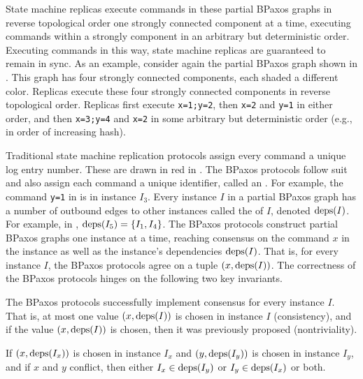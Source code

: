 State machine replicas execute commands in these partial BPaxos graphs in
reverse topological order one strongly connected component at a time, executing
commands within a strongly component in an arbitrary but deterministic order.
Executing commands in this way, state machine replicas are guaranteed to remain
in sync. As an example, consider again the partial BPaxos graph shown in
. This graph has four strongly connected components, each
shaded a different color. Replicas execute these four strongly connected
components in reverse topological order. Replicas first execute
\texttt{x=1;y=2}, then \texttt{x=2} and \texttt{y=1} in either order, and then
\texttt{x=3;y=4} and \texttt{x=2} in some arbitrary but deterministic order
(e.g., in order of increasing hash).

Traditional state machine replication protocols assign every command a unique
log entry number. These are drawn in red in . The BPaxos
protocols follow suit and also assign each command a unique identifier, called
an . For example, the command \texttt{y=1} in
 is in instance $I_3$. Every instance $I$ in a partial BPaxos
graph has a number of outbound edges to other instances called the
 of $I$, denoted $\text{deps}(I)$. For example, in
, $\text{deps}(I_5) = \{I_1, I_4\}$.
%
The BPaxos protocols construct partial BPaxos graphs one instance at a time,
reaching consensus on the command $x$ in the instance as well as the instance's
dependencies $\text{deps}(I)$. That is, for every instance $I$, the BPaxos protocols
agree on a tuple $(x, \text{deps}(I))$.
%
The correctness of the BPaxos protocols hinges on the following two key
invariants.

\begin{invariant}
  The BPaxos protocols successfully implement consensus for every instance $I$.
  That is, at most one value $(x, \text{deps}(I))$ is chosen in instance $I$
  (consistency), and if the value $(x, \text{deps}(I))$ is chosen, then it was
  previously proposed (nontriviality).
\end{invariant}%
%
\begin{invariant}
  If $(x, \text{deps}(I_x))$ is chosen in instance $I_x$ and $(y, \text{deps}(I_y))$ is
  chosen in instance $I_y$, and if $x$ and $y$ conflict, then either $I_x \in
  \text{deps}(I_y)$ or $I_y \in \text{deps}(I_x)$ or both.
\end{invariant}

